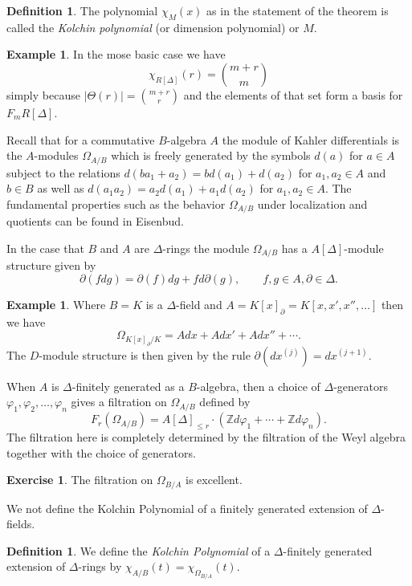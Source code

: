 \documentclass[12pt]{book}
\numberwithin{equation}{section}
\theoremstyle{definition}
\newtheorem{definition}[theorem]{Definition}
\newtheorem{example}[theorem]{Example}
\newtheorem{exercise}[theorem]{Exercise}
\theoremstyle{remark}
\newcommand{\ZZ}{\mathbb{Z}}
\begin{document}
\begin{definition}
	The polynomial $\chi_M(x)$ as in the statement of the theorem is called the \emph{Kolchin polynomial} (or dimension polynomial) or $M$.
\end{definition}

\begin{example}
	In the mose basic case we have 
	$$\chi_{R[\Delta]}(r) = { m+r \choose m }$$
	simply because $\vert \Theta(r) \vert = {m+r \choose r}$ and the elements of that set form a basis for $F_mR[\Delta]$.
\end{example}

Recall that for a commutative $B$-algebra $A$ the module of Kahler differentials is the $A$-modules $\Omega_{A/B}$ which is freely generated by the symbols $d(a)$ for $a\in A$ subject to the relations $d(ba_1+a_2) = bd(a_1)+d(a_2)$ for $a_1,a_2\in A$ and $b\in B$ as well as $d(a_1a_2)= a_2 d(a_1) + a_1 d(a_2)$ for $a_1,a_2 \in A$. 
The fundamental properties such as the behavior $\Omega_{A/B}$ under localization and quotients can be found in Eisenbud. 

In the case that $B$ and $A$ are $\Delta$-rings the module $\Omega_{A/B}$ has a $A[\Delta]$-module structure given by 
$$\partial( f dg ) = \partial(f) dg + f d\partial(g), \qquad f,g\in A, \partial \in \Delta.$$

\begin{example}
	Where $B=K$ is a $\Delta$-field and $A = K[x]_{\partial} = K[x,x',x'',\ldots]$ then we have 
	$$ \Omega_{K[x]_{\partial}/K} = A dx + A dx' + A dx'' + \cdots. $$
	The $D$-module structure is then given by the rule $\partial(dx^{(j)}) = dx^{(j+1)}$.
\end{example}

When $A$ is $\Delta$-finitely generated as a $B$-algebra, then a choice of $\Delta$-generators $\varphi_1, \varphi_2, \ldots, \varphi_n$ gives a filtration on $\Omega_{A/B}$ defined by 
$$ F_r(\Omega_{A/B}) = A[\Delta]_{\leq r} \cdot \left( \ZZ d\varphi_1 + \cdots + \ZZ d\varphi_n \right).$$
The filtration here is completely determined by the filtration of the Weyl algebra together with the choice of generators.


\begin{exercise}
	The filtration on $\Omega_{B/A}$ is excellent.
\end{exercise}

We not define the Kolchin Polynomial of a finitely generated extension of $\Delta$-fields.
\begin{definition}
	We define the \emph{Kolchin Polynomial} of a $\Delta$-finitely generated extension of $\Delta$-rings by $\chi_{A/B}(t) = \chi_{\Omega_{B/A}}(t)$.
\end{definition}
\end{document}
